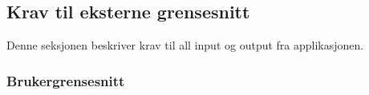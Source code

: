 \documentclass[a4paper, 12pt]{article}
\begin{document}
\subsection{Krav til eksterne grensesnitt}
Denne seksjonen beskriver krav til all input og output fra applikasjonen.

\subsubsection{Brukergrensesnitt}

\begin{figure}[hb]
	\centering
	\quad

\end{figure}
\end{document}
